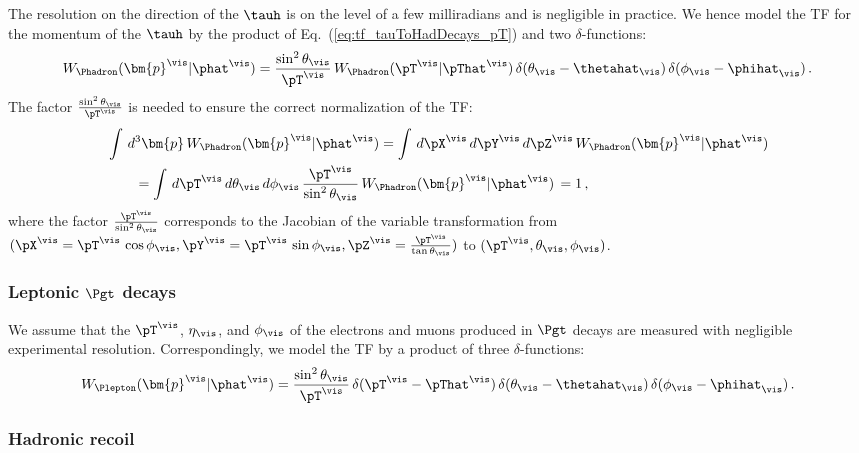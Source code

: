 The resolution on the direction of the $\tauh$ is on the level
of a few milliradians and is negligible in practice.
We hence model the TF for the momentum of the $\tauh$ by the product of Eq.~(\ref{eq:tf_tauToHadDecays_pT}) and two
$\delta$-functions:
\begin{equation}
W_{\Phadron}( \bm{p}^{\vis} | \phat^{\vis} ) =
 \frac{\sin^{2}\theta_{\vis}}{\pT^{\vis}} \, 
  W_{\Phadron}( \pT^{\vis} | \pThat^{\vis} ) \,
  \delta( \theta_{\vis} - \thetahat_{\vis} ) \, 
  \delta( \phi_{\vis} - \phihat_{\vis} ) \, .
\label{eq:tf_tauToHadDecays}
\end{equation}
The factor $\frac{\sin^{2}\theta_{\vis}}{\pT^{\vis}}$ is needed
to ensure the correct normalization of the TF:
\begin{align}
& \int \, d^{3}\bm{p}  \, W_{\Phadron}( \bm{p}^{\vis} | \phat^{\vis} ) = \int \, d\pX^{\vis} \, d\pY^{\vis} \, d\pZ^{\vis} \, W_{\Phadron}( \bm{p}^{\vis} | \phat^{\vis} ) \nonumber \\
& \qquad = \int \, d\pT^{\vis} \, d\theta_{\vis} \, d\phi_{\vis} \,
\frac{\pT^{\vis}}{\sin^{2} \theta_{\vis}} \, W_{\Phadron}( \bm{p}^{\vis} | \phat^{\vis} ) \, 
  = 1 \, ,
\end{align}
where the factor $\frac{\pT^{\vis}}{\sin^{2} \theta_{\vis}}$ corresponds to the Jacobian of the variable transformation 
from $(\pX^{\vis} = \pT^{\vis} \, \cos\phi_{\vis}, \pY^{\vis} = \pT^{\vis} \, \sin\phi_{\vis}, \pZ^{\vis} = \frac{\pT^{\vis}}{\tan\theta_{\vis}})$ 
to $(\pT^{\vis}, \theta_{\vis}, \phi_{\vis})$.


\subsubsection{Leptonic $\Pgt$ decays}
\label{sec:mem_TF_tauToLepDecays}

We assume that the $\pT^{\vis}$, $\eta_{\vis}$, and $\phi_{\vis}$
of the electrons and muons produced in $\Pgt$ decays are measured with negligible experimental resolution.
Correspondingly, we model the TF by a product of three $\delta$-functions:
\begin{equation}
W_{\Plepton}( \bm{p}^{\vis} | \phat^{\vis} ) =  
 \frac{\sin^{2} \theta_{\vis}}{\pT^{\vis}} \, 
  \delta( \pT^{\vis} - \pThat^{\vis} ) \, 
  \delta( \theta_{\vis} - \thetahat_{\vis} ) \, 
  \delta( \phi_{\vis} - \phihat_{\vis} ) \, .
\label{eq:tf_tauToLepDecays}
\end{equation}


\subsubsection{Hadronic recoil}
\label{sec:mem_TF_hadRecoil}

